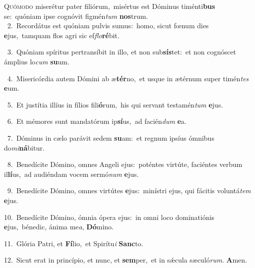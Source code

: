 \lettrine{\initial\textcolor{\initialcolor}{Q}}{uómodo} miserétur pater filiórum,~\dagger misértus est Dóminus timénti\textbf{bus} se:~\star quóniam ipse cognóvit figmén\textit{tum} \textbf{nos}\-trum.\\
{\numbfont\textcolor{\numbcolor}{~2.}}~Recordátus est quóniam pulvis sumus:~\dagger homo, sicut fœnum dies \textbf{e}\-jus,~\star tamquam flos agri sic ef\-\textit{flo}\-\textbf{ré}bit.\par
{\numbfont\textcolor{\numbcolor}{~3.}}~Quóniam spíritus pertransíbit in illo, et non sub\-\textbf{sís}\-tet:~\star et non cognóscet ámplius lo\textit{cum} \textbf{su}\-um.\par
{\numbfont\textcolor{\numbcolor}{~4.}}~Misericórdia autem Dómini ab æ\-\textbf{tér}\-no,~\star et usque in ætérnum super timén\textit{tes} \textbf{e}\-um.\par
{\numbfont\textcolor{\numbcolor}{~5.}}~Et justítia illíus in fílios fili\-\textbf{ó}\-rum,~\star his qui servant testamén\textit{tum} \textbf{e}\-jus.\par
{\numbfont\textcolor{\numbcolor}{~6.}}~Et mémores sunt mandatórum ip\-\textbf{sí}\-us,~\star ad facién\textit{dum} \textbf{e}\-a.\par
{\numbfont\textcolor{\numbcolor}{~7.}}~Dóminus in cælo parávit sedem \textbf{su}\-am:~\star et regnum ipsíus ómnibus do\-\textit{mi}\-\textbf{ná}bitur.\par
{\numbfont\textcolor{\numbcolor}{~8.}}~Benedícite Dómino, omnes Angeli ejus:~\dagger poténtes virtúte, faciéntes verbum il\-\textbf{lí}\-us,~\star ad audiéndam vocem sermó\textit{num} \textbf{e}\-jus.\par
{\numbfont\textcolor{\numbcolor}{~9.}}~Benedícite Dómino, omnes virtútes \textbf{e}\-jus:~\star minístri ejus, qui fácitis voluntá\textit{tem} \textbf{e}\-jus.\par
{\numbfont\textcolor{\numbcolor}{10.}}~Benedícite Dómino, ómnia ópera ejus:~\dagger in omni loco dominatiónis \textbf{e}\-jus,~\star bénedic, ánima me\-\textit{a}\-, \textbf{Dó}\-mino.\par
{\numbfont\textcolor{\numbcolor}{11.}}~Glória Patri, et \textbf{Fí}\-lio,~\star et Spirítu\textit{i} \textbf{Sanc}\-to.\par
{\numbfont\textcolor{\numbcolor}{12.}}~Sicut erat in princípio, et nunc, et \textbf{sem}\-per,~\star et in sǽcula sæculó\-\textit{rum}\-. \textbf{A}\-men.\par
